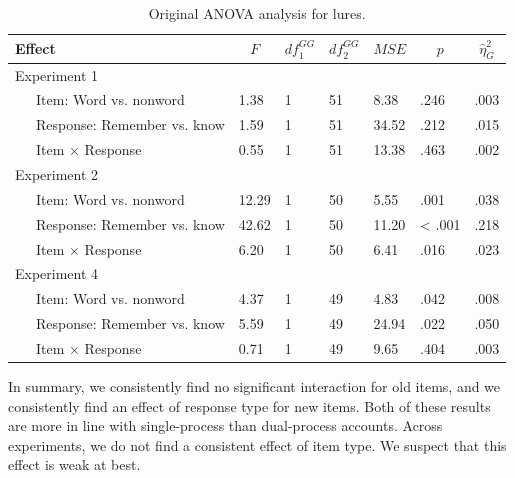 \documentclass[english,,man,floatsintext]{apa6}
\begin{document}
\begin{table}[tbp]

\begin{center}
\begin{threeparttable}

\caption{\label{tab:orig-anova-lure}Original ANOVA analysis for lures.}

\begin{tabular}{lllllll}
\toprule
Effect & \multicolumn{1}{c}{$F$} & \multicolumn{1}{c}{$\mathit{df}_1^{GG}$} & \multicolumn{1}{c}{$\mathit{df}_2^{GG}$} & \multicolumn{1}{c}{$\mathit{MSE}$} & \multicolumn{1}{c}{$p$} & \multicolumn{1}{c}{$\hat{\eta}^2_G$}\\
\midrule
Experiment 1 &  &  &  &  &  & \\
\ \ \ Item: Word vs. nonword & 1.38 & 1 & 51 & 8.38 & .246 & .003\\
\ \ \ Response: Remember vs. know & 1.59 & 1 & 51 & 34.52 & .212 & .015\\
\ \ \ Item $\times$ Response & 0.55 & 1 & 51 & 13.38 & .463 & .002\\
Experiment 2 &  &  &  &  &  & \\
\ \ \ Item: Word vs. nonword & 12.29 & 1 & 50 & 5.55 & .001 & .038\\
\ \ \ Response: Remember vs. know & 42.62 & 1 & 50 & 11.20 & < .001 & .218\\
\ \ \ Item $\times$ Response & 6.20 & 1 & 50 & 6.41 & .016 & .023\\
Experiment 4 &  &  &  &  &  & \\
\ \ \ Item: Word vs. nonword & 4.37 & 1 & 49 & 4.83 & .042 & .008\\
\ \ \ Response: Remember vs. know & 5.59 & 1 & 49 & 24.94 & .022 & .050\\
\ \ \ Item $\times$ Response & 0.71 & 1 & 49 & 9.65 & .404 & .003\\
\bottomrule
\end{tabular}

\end{threeparttable}
\end{center}

\end{table}

In summary, we consistently find no significant interaction for old items, and we consistently find an effect of response type for new items. Both of these results are more in line with single-process than dual-process accounts. Across experiments, we do not find a consistent effect of item type. We suspect that this effect is weak at best.
\end{document}
